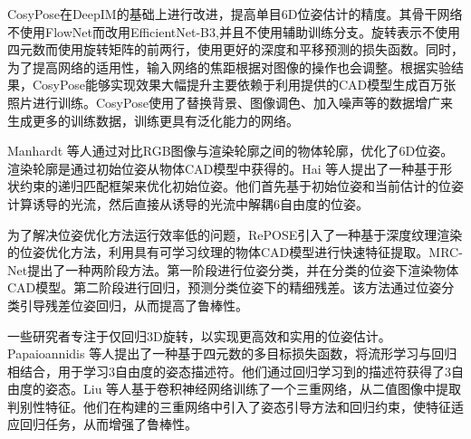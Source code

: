 \par CosyPose\cite{labbe2020cosypose}在DeepIM\cite{li2018deepim}的基础上进行改进，提高单目6D位姿估计的精度。其骨干网络不使用FlowNet\cite{dosovitskiy2015flownet}而改用EfficientNet-B3\cite{koonce2021efficientnet},并且不使用辅助训练分支。旋转表示不使用四元数而使用旋转矩阵的前两行，使用更好的深度和平移预测的损失函数。同时，为了提高网络的适用性，输入网络的焦距根据对图像的操作也会调整。根据实验结果，CosyPose能够实现效果大幅提升主要依赖于利用提供的CAD模型生成百万张照片进行训练。CosyPose使用了替换背景、图像调色、加入噪声等的数据增广来生成更多的训练数据，训练更具有泛化能力的网络。

\par Manhardt 等人\cite{manhardt2018deep}通过对比RGB图像与渲染轮廓之间的物体轮廓，优化了6D位姿。渲染轮廓是通过初始位姿从物体CAD模型中获得的。Hai 等人\cite{hai2023shape}提出了一种基于形状约束的递归匹配框架来优化初始位姿。他们首先基于初始位姿和当前估计的位姿计算诱导的光流，然后直接从诱导的光流中解耦6自由度的位姿。

\par 为了解决位姿优化方法运行效率低的问题，RePOSE\cite{iwase2021repose}引入了一种基于深度纹理渲染的位姿优化方法，利用具有可学习纹理的物体CAD模型进行快速特征提取。MRC-Net\cite{li2024mrcnet}提出了一种两阶段方法。第一阶段进行位姿分类，并在分类的位姿下渲染物体CAD模型。第二阶段进行回归，预测分类位姿下的精细残差。该方法通过位姿分类引导残差位姿回归，从而提高了鲁棒性。

一些研究者专注于仅回归3D旋转，以实现更高效和实用的位姿估计。Papaioannidis 等人\cite{8765585}提出了一种基于四元数的多目标损失函数，将流形学习与回归相结合，用于学习3自由度的姿态描述符。他们通过回归学习到的描述符获得了3自由度的姿态。Liu 等人\cite{liu2019regression}基于卷积神经网络训练了一个三重网络，从二值图像中提取判别性特征。他们在构建的三重网络中引入了姿态引导方法和回归约束，使特征适应回归任务，从而增强了鲁棒性。

